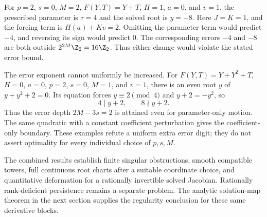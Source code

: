 \begin{example}\label{ex:motion-boundary}
For $p=2$, $s=0$, $M=2$, $F(Y,T)=Y+T$, $H=1$, $a=0$, and $v=1$,
the prescribed parameter is $\tau=4$ and the solved root is $y=-8$.
Here $J=K=1$, and the forcing term is $H(a)+Kv=2$. Omitting the parameter
term would predict $-4$, and reversing its sign would predict $0$.
The corresponding errors $-4$ and $-8$ are both outside
$2^{2M}\Z_2=16\Z_2$. Thus either change would violate the stated error
bound.

The error exponent cannot uniformly be increased. For
$F(Y,T)=Y+Y^2+T$, $H=0$, $a=0$, $p=2$, $s=0$, $M=1$, and $v=1$,
there is an even root $y$ of $y+y^2+2=0$. Its equation forces
$y\equiv2\pmod4$ and $y+2=-y^2$, so
\[
 4\mid y+2,\qquad 8\nmid y+2.
\]
Thus the error depth $2M-3s=2$ is attained even for parameter-only motion.
The same quadratic with a constant coefficient perturbation gives the
coefficient-only boundary. These examples refute a uniform extra error
digit; they do not assert optimality for every individual choice of
$p,s,M$.
\end{example}

The combined results establish finite singular obstructions, smooth
compatible towers, full continuous root charts after a suitable coordinate
choice, and quantitative deformation for a rationally invertible solved
Jacobian. Rationally rank-deficient persistence remains a separate problem.
The analytic solution-map theorem in the next section supplies the
regularity conclusion for these same derivative blocks.
